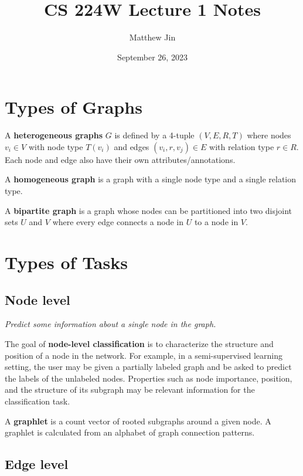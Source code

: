 \documentclass[12pt]{article}
\begin{document}
\title{CS 224W Lecture 1 Notes}
\author{Matthew Jin}
\date{September 26, 2023}
\maketitle

\section*{Types of Graphs}

A \textbf{heterogeneous graphs} $G$ is defined by a 4-tuple $(V, E, R, T)$ where nodes
$v_i \in V$ with node type $T(v_i)$ and edges $(v_i, r, v_j) \in E$ with
relation type $r \in R$. Each node and edge also have their own
attributes/annotations.

\smallskip
A \textbf{homogeneous graph} is a graph with a single node type and a single
relation type.

\smallskip
A \textbf{bipartite graph} is a graph whose nodes can be partitioned into two disjoint
sets $U$ and $V$ where every edge connects a node in $U$ to a node in $V$.

\section*{Types of Tasks}

\subsection*{Node level}

\textit{Predict some information about a single node in the graph.}

\medskip
The goal of \textbf{node-level classification} is to characterize the structure
and position of a node in the network. For example, in a semi-supervised
learning setting, the user may be given a partially labeled graph and be asked
to predict the labels of the unlabeled nodes. Properties such as node
importance, position, and the structure of its subgraph may be relevant
information for the classification task.

\medskip
A \textbf{graphlet} is a count vector of rooted subgraphs around a given
node. A graphlet is calculated from an alphabet of graph connection patterns.


\subsection*{Edge level}
\end{document}

